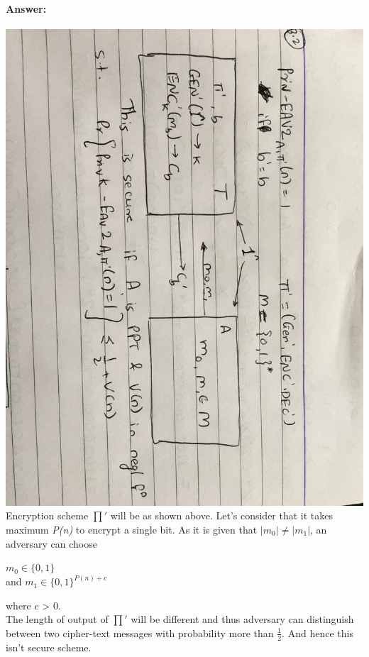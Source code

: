 \documentclass{article}
\begin{document}
    \paragraph{Answer: \newline}
        \includegraphics[scale=0.1]{S3Q2}
        \newline\newline
        Encryption scheme $\prod\prime$ will be as shown above. Let's consider that it takes maximum \emph{P(n)} to encrypt a single bit. As it is given that $|m_0| \neq |m_1|$, an adversary can choose \newline
        \begin{center}
            $m_0 \in {\{0,1\}}$ \\
            and $m_1 \in {\{0,1\}}^{P(n)+c}$\\
        \end{center}
        where c > 0. \\
        The length of output of $\prod\prime$ will be different and thus adversary can distinguish between two cipher-text messages with probability more than $\frac{1}{2}$. And hence this isn't secure scheme.
        
\end{document}
